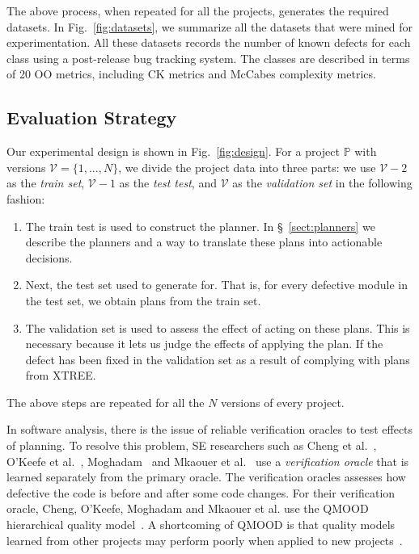 \documentclass[sigconf, proceedings, 9pt]{acmart}
\newcommand{\be}{\begin{enumerate}}
\newcommand{\ee}{\end{enumerate}}
\newcommand{\tion}[1]{\S~\ref{sect:#1}}
\newcommand{\fig}[1]{Fig.~\ref{fig:#1}}
\begin{document}
The above process, when repeated for all the projects, generates the required 
datasets. In \fig{datasets}, we summarize all the datasets that were mined for 
experimentation. All these datasets records the number of known defects 
for each class using a post-release bug tracking system. The classes are 
described in terms of 20 OO metrics, including CK metrics and McCabes 
complexity metrics. 


\subsection{Evaluation Strategy}
\label{sect:procedure}


Our experimental design is shown in \fig{design}. For a project $\mathbb{P}$ 
with versions $\mathcal{V}=\{1, ..., N\}$, we divide the
project data  into three parts: we use $\mathcal{V}-2$ as the \textit{train 
set}, $\mathcal{V}-1$ as the \textit{test test}, and $\mathcal{V}$ as the
\textit{validation set} in the following fashion:

\be
\item The train test is used to construct the planner. In \tion{planners} we 
describe the planners and a way to translate these plans 
into actionable decisions. 
\item Next, the test set used to generate for. That is, for every defective 
module in the test set, we obtain plans from the train set.
\item The validation set is used to assess the effect of acting on these plans. 
This is necessary because it lets us judge the  effects of applying the plan. 
If the defect has been fixed in the validation set as a result of complying 
with plans from XTREE.
\ee

The above steps are repeated for all the $N$ versions of every project. 

In software analysis, there is the issue of reliable verification oracles to 
test effects of planning. To resolve this problem, SE researchers such as
Cheng et al.~\cite{Cheng10}, O'Keefe et al.~\cite{OKeeffe08,OKeeffe07},
Moghadam~\cite{Moghadam2011} and Mkaouer et al.~\cite{Mkaouer14}
use a {\em verification oracle} that is learned separately
from the primary oracle. The verification oracles assesses
how defective the code is before and after some
code changes.
For their verification oracle,
Cheng, O'Keefe, Moghadam and  Mkaouer et al. use the QMOOD hierarchical
quality model~\cite{Bansiya02}.
A shortcoming of QMOOD
is that quality models learned from other projects
may perform poorly when applied to new projects~\cite{localvsglobal}.
\end{document}

